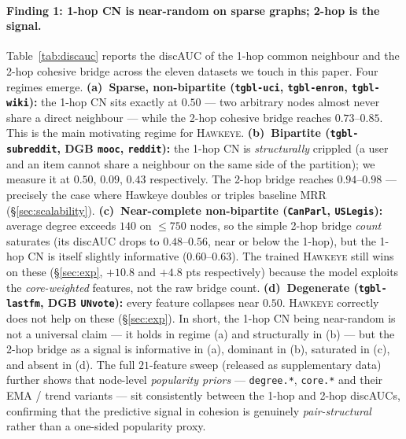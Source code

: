 \documentclass[sigconf,nonacm,review]{acmart}
\newcommand{\method}{\textsc{Hawkeye}\xspace}
\begin{document}
\paragraph{Finding 1: 1-hop CN is near-random on sparse graphs; 2-hop is the signal.}
Table~\ref{tab:discauc} reports the discAUC of the 1-hop common neighbour
and the 2-hop cohesive bridge across the eleven datasets we touch in this
paper.  Four regimes emerge.
\textbf{(a)~Sparse, non-bipartite (\texttt{tgbl-uci}, \texttt{tgbl-enron},
\texttt{tgbl-wiki}):}
the 1-hop CN sits exactly at $0.50$ --- two arbitrary nodes almost never
share a direct neighbour --- while the 2-hop cohesive bridge reaches
$0.73$--$0.85$.  This is the main motivating regime for \method.
\textbf{(b)~Bipartite (\texttt{tgbl-subreddit}, DGB \texttt{mooc},
\texttt{reddit}):}
the 1-hop CN is \emph{structurally} crippled (a user and an item cannot
share a neighbour on the same side of the partition); we measure it at
$0.50$, $0.09$, $0.43$ respectively.  The 2-hop bridge reaches $0.94$--$0.98$
--- precisely the case where Hawkeye doubles or triples baseline MRR
(\S\ref{sec:scalability}).
\textbf{(c)~Near-complete non-bipartite (\texttt{CanParl}, \texttt{USLegis}):}
average degree exceeds $140$ on $\le 750$ nodes, so the simple 2-hop bridge
\emph{count} saturates (its discAUC drops to $0.48$--$0.56$, near or below
the 1-hop), but the 1-hop CN is itself slightly informative ($0.60$--$0.63$).
The trained \method still wins on these (\S\ref{sec:exp}, $+10.8$ and $+4.8$
pts respectively) because the model exploits the \emph{core-weighted}
features, not the raw bridge count.
\textbf{(d)~Degenerate (\texttt{tgbl-lastfm}, DGB \texttt{UNvote}):}
every feature collapses near $0.50$.  \method correctly does not help on
these (\S\ref{sec:exp}).
In short, the 1-hop CN being near-random is not a universal claim --- it
holds in regime (a) and structurally in (b) --- but the 2-hop bridge as a
signal is informative in (a), dominant in (b), saturated in (c), and
absent in (d). The full $21$-feature sweep (released as supplementary
data) further shows that node-level \emph{popularity priors} ---
\texttt{degree.*}, \texttt{core.*} and their EMA / trend variants ---
sit consistently between the 1-hop and 2-hop discAUCs, confirming that
the predictive signal in cohesion is genuinely \emph{pair-structural}
rather than a one-sided popularity proxy.
\end{document}
